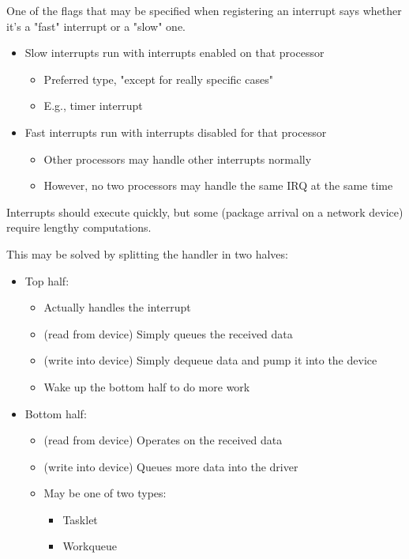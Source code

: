 \begin{frame}{\secname}
    One of the flags that may be specified when registering an interrupt says whether it's a "fast" interrupt or a "slow" one.

    \begin{itemize}
        \item Slow interrupts run with interrupts enabled on that processor
        \begin{itemize}
            \item Preferred type, "except for really specific cases"
            \item E.g., timer interrupt
        \end{itemize}
        \item Fast interrupts run with interrupts disabled for that processor
        \begin{itemize}
            \item Other processors may handle other interrupts normally
            \item However, no two processors may handle the same IRQ at the same time
        \end{itemize}
    \end{itemize}
\end{frame}

\begin{frame}{\secname}
    Interrupts should execute quickly, but some (package arrival on a network device) require lengthy computations.

    This may be solved by splitting the handler in two halves:

    \begin{itemize}
        \item Top half:
        \begin{itemize}
            \item Actually handles the interrupt
            \item (read from device) Simply queues the received data
            \item (write into device) Simply dequeue data and pump it into the device
            \item Wake up the bottom half to do more work
        \end{itemize}
        \item Bottom half:
        \begin{itemize}
            \item (read from device) Operates on the received data
            \item (write into device) Queues more data into the driver
            \item May be one of two types:
            \begin{itemize}
                \item Tasklet
                \item Workqueue
            \end{itemize}
        \end{itemize}
    \end{itemize}
\end{frame}

